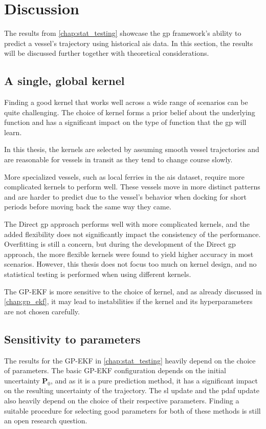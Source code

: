 \chapter{Discussion}\label{chap:discussion}

The results from \cref{chap:stat_testing} showcase the \acrshort{gp} framework's ability to predict a vessel's trajectory using historical \acrshort{ais} data. In this section, the results will be discussed further together with theoretical considerations.

\section{A single, global kernel}
Finding a good kernel that works well across a wide range of scenarios can be quite challenging. The choice of kernel forms a prior belief about the underlying function and has a significant impact on the type of function that the \acrshort{gp} will learn. 

In this thesis, the kernels are selected by assuming smooth vessel trajectories and are reasonable for vessels in transit as they tend to change course slowly. 

More specialized vessels, such as local ferries in the \acrshort{ais} dataset, require more complicated kernels to perform well. These vessels move in more distinct patterns and are harder to predict due to the vessel's behavior when docking for short periods before moving back the same way they came. 

The Direct \acrshort{gp} approach performs well with more complicated kernels, and the added flexibility does not significantly impact the consistency of the performance. Overfitting is still a concern, but during the development of the Direct \acrshort{gp} approach, the more flexible kernels were found to yield higher accuracy in most scenarios. However, this thesis does not focus too much on kernel design, and no statistical testing is performed when using different kernels.

The GP-EKF is more sensitive to the choice of kernel, and as already discussed in \cref{chap:gp_ekf}, it may lead to instabilities if the kernel and its hyperparameters are not chosen carefully.  

\section{Sensitivity to parameters}
The results for the GP-EKF in \cref{chap:stat_testing} heavily depend on the choice of parameters. The basic GP-EKF configuration depends on the initial uncertainty $\boldsymbol{P}_0$, and as it is a pure prediction method, it has a significant impact on the resulting uncertainty of the trajectory. The \acrshort{sl} update and the \acrshort{pdaf} update also heavily depend on the choice of their respective parameters. Finding a suitable procedure for selecting good parameters for both of these methods is still an open research question. 

